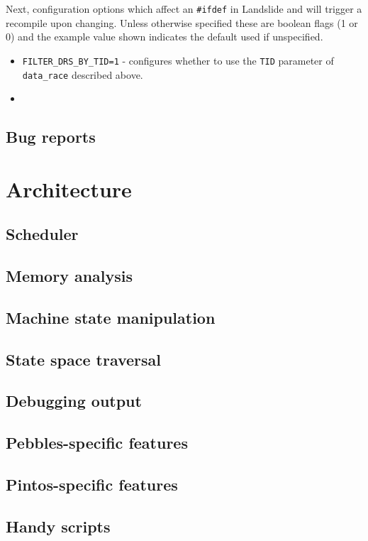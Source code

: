 Next, configuration options which affect an {\tt \#ifdef} in Landslide and will trigger a recompile upon changing.
Unless otherwise specified these are boolean flags (1 or 0) and the example value shown indicates the default used if unspecified.

\begin{itemize}
	\item {\tt FILTER\_DRS\_BY\_TID=1} - configures whether to use the {\tt TID} parameter of {\tt data\_race} described above.
	\item %
\end{itemize}

\subsection{Bug reports}

\section{Architecture}

\subsection{Scheduler}
\subsection{Memory analysis}
\subsection{Machine state manipulation}
\subsection{State space traversal}
\subsection{Debugging output}
\subsection{Pebbles-specific features}
\subsection{Pintos-specific features}
\subsection{Handy scripts}
\label{sec:landslide-glue}

